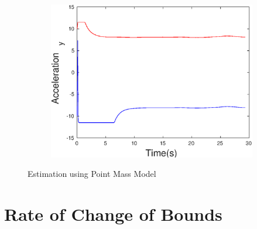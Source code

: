 \begin{figure}[h]
\begin{subfigure}{.5\linewidth}
\end{subfigure}
\begin{subfigure}{.5\linewidth}
\centering
\includegraphics[width=.9\linewidth]{figures/HInf/s3pmHInfAcceleration_y}
\end{subfigure}
\caption{Estimation using Point Mass Model}
\end{figure}

\section{Rate of Change of Bounds}

